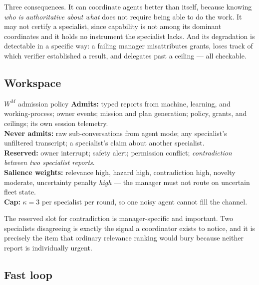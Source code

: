 \documentclass[11pt]{article}
\begin{document}
Three consequences. It can coordinate agents better than itself, because knowing \emph{who is authoritative about what} does not require being able to do the work. It may not certify a specialist, since capability is not among its dominant coordinates and it holds no instrument the specialist lacks. And its degradation is detectable in a specific way: a failing manager misattributes grants, loses track of which verifier established a result, and delegates past a ceiling --- all checkable.

\subsection{Workspace}

\begin{specbox}{$W^{M}$ admission policy}
\textbf{Admits:} typed reports from machine, learning, and working-process; owner events; mission and plan generation; policy, grants, and ceilings; its own session telemetry.\\[3pt]
\textbf{Never admits:} raw sub-conversations from agent mode; any specialist's unfiltered transcript; a specialist's claim about another specialist.\\[3pt]
\textbf{Reserved:} owner interrupt; safety alert; permission conflict; \emph{contradiction between two specialist reports}.\\[3pt]
\textbf{Salience weights:} relevance high, hazard high, contradiction high, novelty moderate, uncertainty penalty \emph{high} --- the manager must not route on uncertain fleet state.\\[3pt]
\textbf{Cap:} $\kappa=3$ per specialist per round, so one noisy agent cannot fill the channel.
\end{specbox}

The reserved slot for contradiction is manager-specific and important. Two specialists disagreeing is exactly the signal a coordinator exists to notice, and it is precisely the item that ordinary relevance ranking would bury because neither report is individually urgent.

\subsection{Fast loop}
\end{document}
